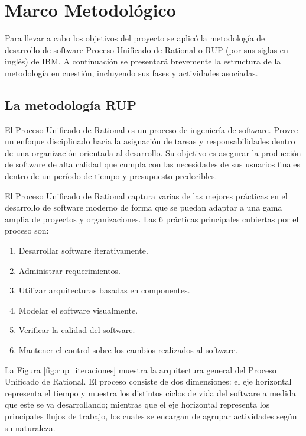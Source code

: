 \chapter{Marco Metodológico}
Para llevar a cabo los objetivos del proyecto se aplicó la metodología de desarrollo de software Proceso Unificado de Rational o RUP (por sus siglas en inglés) de IBM. A continuación se presentará brevemente la estructura de la metodología en cuestión, incluyendo sus fases y actividades asociadas.

\section{La metodología RUP}
El Proceso Unificado de Rational es un proceso de ingeniería de software. Provee un enfoque disciplinado hacia la asignación de tareas y responsabilidades dentro de una organización orientada al desarrollo. Su objetivo es asegurar la producción de software de alta calidad que cumpla con las necesidades de sus usuarios finales dentro de un período de tiempo y presupuesto predecibles. \cite{rupKruchten}

El Proceso Unificado de Rational captura varias de las mejores prácticas en el desarrollo de software moderno de forma que se puedan adaptar a una gama amplia de proyectos y organizaciones. Las 6 prácticas principales cubiertas por el proceso son:

\begin{enumerate}
    \item Desarrollar software iterativamente.
    \item Administrar requerimientos.
    \item Utilizar arquitecturas basadas en componentes.
    \item Modelar el software visualmente.
    \item Verificar la calidad del software.
    \item Mantener el control sobre los cambios realizados al software.
\end{enumerate}

La Figura \ref{fig:rup_iteraciones} muestra la arquitectura general del Proceso Unificado de Rational. El proceso consiste de dos dimensiones: el eje horizontal representa el tiempo y muestra los distintos ciclos de vida del software a medida que este se va desarrollando; mientras que el eje horizontal representa los principales flujos de trabajo, los cuales se encargan de agrupar actividades según su naturaleza.

